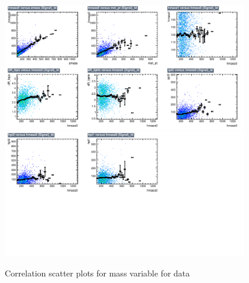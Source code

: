 \begin{figure}[!htb]%
\centering
\includegraphics[width=0.95\textwidth]{figures/CRTT/dataset/plots/correlationscatter_hmass0__Id_c1.pdf}
\includegraphics[width=0.95\textwidth]{figures/CRTT/dataset/plots/correlationscatter_hmass0__Id_c2.pdf}
\caption{ Correlation scatter plots for \HZZ mass  variable for data}%
\label{fig:correlations_CRTT_hmass0_S}                                                       
\end{figure}



